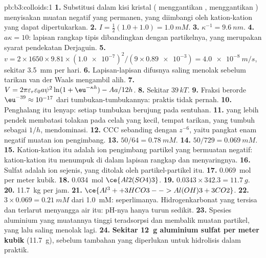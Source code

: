\begin{solution}{pb:b3:colloids:1}
\textbf{1.} Substitusi dalam kisi kristal ( menggantikan ,  menggantikan ) menyisakan
muatan negatif yang permanen, yang diimbangi oleh kation-kation yang dapat dipertukarkan.
\textbf{2.} $I = \frac12(1.0 + 1.0) = \qty{1.0}{mM}$.
\textbf{3.} $\kappa^{-1} = \qty{9.6}{nm}$.
\textbf{4.} $a\kappa = 10$: lapisan rangkap tipis dibandingkan dengan partikelnya, yang
merupakan syarat pendekatan Derjaguin.
\textbf{5.} $v = 2 \times 1650 \times 9.81 \times (\num{1.0e-7})^2/(9 \times \num{0.89e-3}) = \qty{4.0e-8}{m/s}$, sekitar \qty{3.5}{mm} per hari.
\textbf{6.} Lapisan-lapisan difusnya saling menolak sebelum tarikan van der Waals mengambil alih.
\textbf{7.} $V = 2\pi\varepsilon_r\varepsilon_0a\psi^2\ln(1 + \eu^{-\kappa h}) - Aa/12h$.
\textbf{8.} Sekitar $39\,kT$.
\textbf{9.} Fraksi berorde $\eu^{-39} \approx 10^{-17}$ dari tumbukan-tumbukannya: praktis tidak pernah.
\textbf{10.} Penghalang itu lenyap: setiap tumbukan berujung pada sentuhan.
\textbf{11.}  yang lebih pendek membatasi tolakan pada celah yang kecil,
tempat tarikan, yang tumbuh sebagai $1/h$, mendominasi.
\textbf{12.} CCC sebanding dengan $z^{-6}$, yaitu pangkat enam negatif muatan ion pengimbang.
\textbf{13.} $50/64 = \qty{0.78}{mM}$.
\textbf{14.} $50/729 = \qty{0.069}{mM}$.
\textbf{15.} Kation-kation itu adalah ion pengimbang partikel yang bermuatan
negatif: kation-kation itu menumpuk di dalam lapisan rangkap dan
menyaringnya.
\textbf{16.} Sulfat adalah ion sejenis, yang ditolak oleh partikel-partikel itu.
\textbf{17.} \qty{0.069}{mol}  per meter kubik.
\textbf{18.} \qty{0.034}{mol} $\ce{Al2(SO4)3}$.
\textbf{19.} $0.0343 \times 342.3 = \qty{11.7}{g}$.
\textbf{20.} \qty{11.7}{kg} per jam.
\textbf{21.} $\ce{Al^3+ + 3 HCO3- -> Al(OH)3 + 3 CO2}$.
\textbf{22.} $3 \times 0.069 = \qty{0.21}{mM}$ dari \qty{1.0}{mM}: seperlimanya. Hidrogenkarbonat
yang tersisa dan  terlarut menyangga air itu: pH-nya hanya turun
sedikit.
\textbf{23.} Spesies aluminium yang muatannya tinggi teradsorpsi dan membalik muatan
partikel, yang lalu saling menolak lagi.
\textbf{24.} \textbf{Sekitar \qty{12}{g} aluminium sulfat per meter kubik} (\qty{11.7}{g}), sebelum tambahan
yang diperlukan untuk hidrolisis dalam praktik.
\end{solution}

